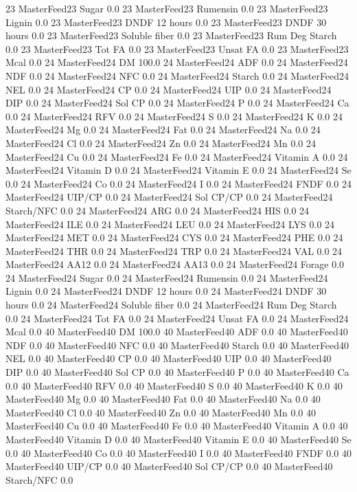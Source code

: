\documentclass[letterpaper,10pt,english]{sphinxmanual}
\begin{document}
\begin{sphinxVerbatim}[commandchars=\\\{\},numbers=left,firstnumber=1,stepnumber=1]
23 MasterFeed23 Sugar \PYGZpc{} 0.0
23 MasterFeed23 Rumensin 0.0
23 MasterFeed23 Lignin 0.0
23 MasterFeed23 DNDF 12 hours 0.0
23 MasterFeed23 DNDF 30 hours 0.0
23 MasterFeed23 Soluble fiber 0.0
23 MasterFeed23 Rum Deg Starch 0.0
23 MasterFeed23 Tot FA 0.0
23 MasterFeed23 Unsat FA 0.0
23 MasterFeed23 Mcal 0.0
24 MasterFeed24 DM 100.0
24 MasterFeed24 ADF 0.0
24 MasterFeed24 NDF 0.0
24 MasterFeed24 NFC 0.0
24 MasterFeed24 Starch 0.0
24 MasterFeed24 NEL 0.0
24 MasterFeed24 CP 0.0
24 MasterFeed24 UIP 0.0
24 MasterFeed24 DIP 0.0
24 MasterFeed24 Sol CP 0.0
24 MasterFeed24 P 0.0
24 MasterFeed24 Ca 0.0
24 MasterFeed24 RFV 0.0
24 MasterFeed24 S 0.0
24 MasterFeed24 K 0.0
24 MasterFeed24 Mg 0.0
24 MasterFeed24 Fat 0.0
24 MasterFeed24 Na 0.0
24 MasterFeed24 Cl 0.0
24 MasterFeed24 Zn 0.0
24 MasterFeed24 Mn 0.0
24 MasterFeed24 Cu 0.0
24 MasterFeed24 Fe 0.0
24 MasterFeed24 Vitamin A 0.0
24 MasterFeed24 Vitamin D 0.0
24 MasterFeed24 Vitamin E 0.0
24 MasterFeed24 Se 0.0
24 MasterFeed24 Co 0.0
24 MasterFeed24 I 0.0
24 MasterFeed24 FNDF 0.0
24 MasterFeed24 UIP/CP 0.0
24 MasterFeed24 Sol CP/CP 0.0
24 MasterFeed24 Starch/NFC 0.0
24 MasterFeed24 ARG 0.0
24 MasterFeed24 HIS 0.0
24 MasterFeed24 ILE 0.0
24 MasterFeed24 LEU 0.0
24 MasterFeed24 LYS 0.0
24 MasterFeed24 MET 0.0
24 MasterFeed24 CYS 0.0
24 MasterFeed24 PHE 0.0
24 MasterFeed24 THR 0.0
24 MasterFeed24 TRP 0.0
24 MasterFeed24 VAL 0.0
24 MasterFeed24 AA\PYGZsh{}12 0.0
24 MasterFeed24 AA\PYGZsh{}13 0.0
24 MasterFeed24 \PYGZpc{} Forage 0.0
24 MasterFeed24 Sugar \PYGZpc{} 0.0
24 MasterFeed24 Rumensin 0.0
24 MasterFeed24 Lignin 0.0
24 MasterFeed24 DNDF 12 hours 0.0
24 MasterFeed24 DNDF 30 hours 0.0
24 MasterFeed24 Soluble fiber 0.0
24 MasterFeed24 Rum Deg Starch 0.0
24 MasterFeed24 Tot FA 0.0
24 MasterFeed24 Unsat FA 0.0
24 MasterFeed24 Mcal 0.0
40 MasterFeed40 DM 100.0
40 MasterFeed40 ADF 0.0
40 MasterFeed40 NDF 0.0
40 MasterFeed40 NFC 0.0
40 MasterFeed40 Starch 0.0
40 MasterFeed40 NEL 0.0
40 MasterFeed40 CP 0.0
40 MasterFeed40 UIP 0.0
40 MasterFeed40 DIP 0.0
40 MasterFeed40 Sol CP 0.0
40 MasterFeed40 P 0.0
40 MasterFeed40 Ca 0.0
40 MasterFeed40 RFV 0.0
40 MasterFeed40 S 0.0
40 MasterFeed40 K 0.0
40 MasterFeed40 Mg 0.0
40 MasterFeed40 Fat 0.0
40 MasterFeed40 Na 0.0
40 MasterFeed40 Cl 0.0
40 MasterFeed40 Zn 0.0
40 MasterFeed40 Mn 0.0
40 MasterFeed40 Cu 0.0
40 MasterFeed40 Fe 0.0
40 MasterFeed40 Vitamin A 0.0
40 MasterFeed40 Vitamin D 0.0
40 MasterFeed40 Vitamin E 0.0
40 MasterFeed40 Se 0.0
40 MasterFeed40 Co 0.0
40 MasterFeed40 I 0.0
40 MasterFeed40 FNDF 0.0
40 MasterFeed40 UIP/CP 0.0
40 MasterFeed40 Sol CP/CP 0.0
40 MasterFeed40 Starch/NFC 0.0

\end{sphinxVerbatim}
\end{document}
